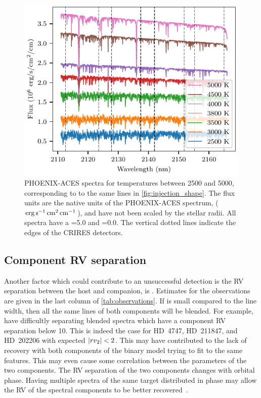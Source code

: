 \begin{figure}
    \centering
    \includegraphics[width=\hsize]{./figures/companion_recovery/companion_spectra.pdf}
    \caption{{PHOENIX-ACES} spectra for temperatures between 2500 and 5000\K{}, corresponding to to the same lines in \cref{fig:injection_shape}.
The flux units are the native units of the {PHOENIX-ACES} spectrum, (\(\rm erg\,s^{-1}\,cm^{2}\,cm^{-1}\)), and have not been scaled by the stellar radii.
All spectra have a \Logg{}=5.0 and \feh{}=0.0.
The vertical dotted lines indicate the edges of the CRIRES detectors.}
    \label{fig:comp_spectra}
\end{figure}

\subsection{Component {RV} separation}
\label{subsec:rv_seperation}
Another factor which could contribute to an unsuccessful detection is the {RV} separation between the host and companion, is \Rvtwo{}.
Estimates for the observations are given in the last column of \cref{tab:observations}.
If \Rvtwo{} is small compared to the line width, then all the same lines of both components will be blended.
For example, \citep{kolbl_detection_2015} have difficultly separating blended spectra which have a component {RV} separation below 10\kmps{}.
This is indeed the case for {HD~4747}, {HD~211847}, and {HD~202206} with expected \(|{rv{}}_{2}{}| < 2\)\kmps{}.
This may have contributed to the lack of recovery with both components of the binary model trying to fit to the same features.
This may even cause some correlation between the parameters of the two components.
The {RV} separation of the two components changes with orbital phase.
Having multiple spectra of the same target distributed in phase may allow the {RV} of the spectral components to be better recovered~\citep [e.g.][]{czekala_disentangling_2017, sablowski_spectral_2016, piskorz_evidence_2016}.


